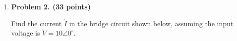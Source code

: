 \begin{enumerate}
% 
% 
% 


\item {\bf Problem 2. (33 points)} 

Find the current $\dot{I}$ in the bridge circuit shown below, assuming the input
voltage is $\dot{V}=10\angle 0^\circ$. 





\end{enumerate}
